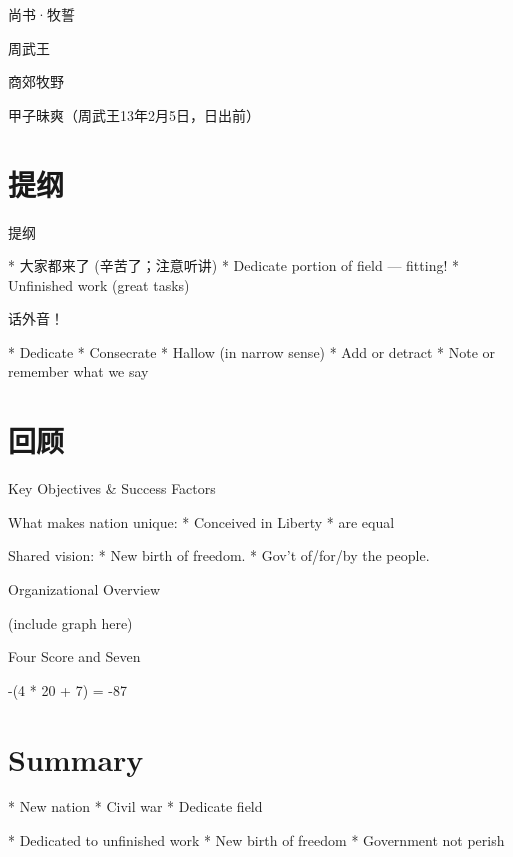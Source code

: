 \documentclass{beamer}
\begin{document}
尚书·牧誓

周武王

商郊牧野

甲子昧爽（周武王13年2月5日，日出前）

\section{提纲}

提纲

  * 大家都来了 (辛苦了；注意听讲)
  * Dedicate portion of field --- fitting!
  * Unfinished work (great tasks)

话外音！

  * Dedicate
  * Consecrate
  * Hallow (in narrow sense)
  * Add or detract
  * Note or remember what we say

\section{回顾}

Key Objectives \& Success Factors

What makes nation unique:
  * Conceived in Liberty
  * are equal

Shared vision:
  * New birth of freedom.
  * Gov't of/for/by the people.

Organizational Overview

(include graph here)

Four Score and Seven

-(4 * 20 + 7) = -87

\section{Summary}

* New nation
* Civil war
* Dedicate field

* Dedicated to unfinished work
* New birth of freedom
* Government not perish
\end{document}
